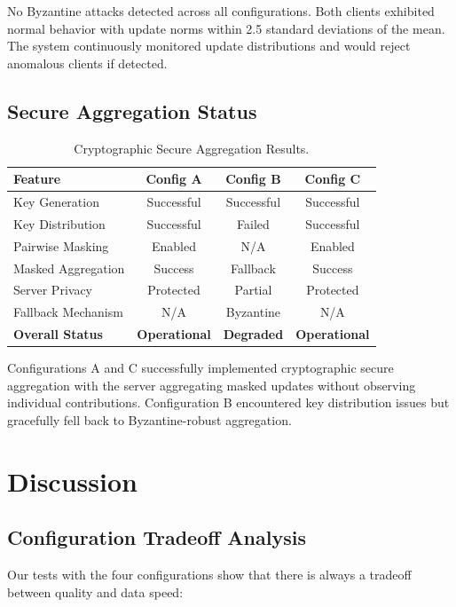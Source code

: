 \documentclass[acmsmall,screen]{acmart}
\begin{document}
No Byzantine attacks detected across all configurations. Both clients exhibited normal behavior with update norms within 2.5 standard deviations of the mean. The system continuously monitored update distributions and would reject anomalous clients if detected.

\subsection{Secure Aggregation Status}

\begin{table}[h]
\centering
\caption{Cryptographic Secure Aggregation Results.}
\label{tab:secure_agg}
\begin{tabular}{@{}lccc@{}}
\toprule
\textbf{Feature} & \textbf{Config A} & \textbf{Config B} & \textbf{Config C} \\
\midrule
Key Generation & Successful & Successful & Successful \\
Key Distribution & Successful & Failed & Successful \\
Pairwise Masking & Enabled & N/A & Enabled \\
Masked Aggregation & Success & Fallback & Success \\
Server Privacy & Protected & Partial & Protected \\
Fallback Mechanism & N/A & Byzantine & N/A \\
\midrule
\textbf{Overall Status} & \textbf{Operational} & \textbf{Degraded} & \textbf{Operational} \\
\bottomrule
\end{tabular}
\end{table}

Configurations A and C successfully implemented cryptographic secure aggregation with the server aggregating masked updates without observing individual contributions. Configuration B encountered key distribution issues but gracefully fell back to Byzantine-robust aggregation.

\section{Discussion}

\subsection{Configuration Tradeoff Analysis}

Our tests with the four configurations show that there is always a tradeoff between quality and data speed:
\end{document}
